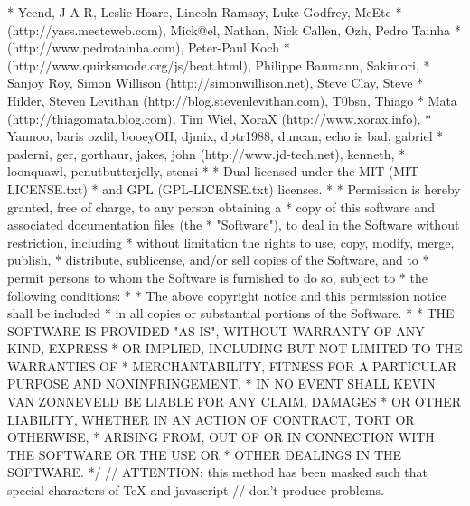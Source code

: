  * Yeend, J A R, Leslie Hoare, Lincoln Ramsay, Luke Godfrey, MeEtc
 * (http://yass.meetcweb.com), Mick@el, Nathan, Nick Callen, Ozh, Pedro Tainha
 * (http://www.pedrotainha.com), Peter-Paul Koch
 * (http://www.quirksmode.org/js/beat.html), Philippe Baumann, Sakimori,
 * Sanjoy Roy, Simon Willison (http://simonwillison.net), Steve Clay, Steve
 * Hilder, Steven Levithan (http://blog.stevenlevithan.com), T0bsn, Thiago
 * Mata (http://thiagomata.blog.com), Tim Wiel, XoraX (http://www.xorax.info),
 * Yannoo, baris ozdil, booeyOH, djmix, dptr1988, duncan, echo is bad, gabriel
 * paderni, ger, gorthaur, jakes, john (http://www.jd-tech.net), kenneth,
 * loonquawl, penutbutterjelly, stensi
 *
 * Dual licensed under the MIT (MIT-LICENSE.txt)
 * and GPL (GPL-LICENSE.txt) licenses.
 *
 * Permission is hereby granted, free of charge, to any person obtaining a
 * copy of this software and associated documentation files (the
 * "Software"), to deal in the Software without restriction, including
 * without limitation the rights to use, copy, modify, merge, publish,
 * distribute, sublicense, and/or sell copies of the Software, and to
 * permit persons to whom the Software is furnished to do so, subject to
 * the following conditions:
 *
 * The above copyright notice and this permission notice shall be included
 * in all copies or substantial portions of the Software.
 *
 * THE SOFTWARE IS PROVIDED "AS IS", WITHOUT WARRANTY OF ANY KIND, EXPRESS
 * OR IMPLIED, INCLUDING BUT NOT LIMITED TO THE WARRANTIES OF
 * MERCHANTABILITY, FITNESS FOR A PARTICULAR PURPOSE AND NONINFRINGEMENT.
 * IN NO EVENT SHALL KEVIN VAN ZONNEVELD BE LIABLE FOR ANY CLAIM, DAMAGES
 * OR OTHER LIABILITY, WHETHER IN AN ACTION OF CONTRACT, TORT OR OTHERWISE,
 * ARISING FROM, OUT OF OR IN CONNECTION WITH THE SOFTWARE OR THE USE OR
 * OTHER DEALINGS IN THE SOFTWARE.
 */
// ATTENTION: this method has been masked such that special characters of TeX and javascript
// don't produce problems.
